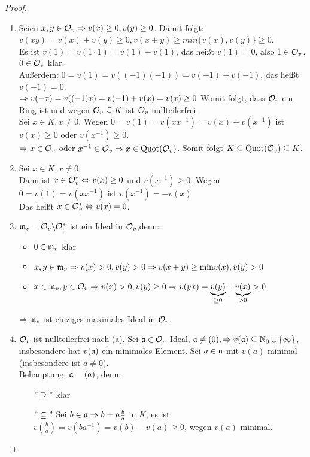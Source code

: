 \begin{proof}
	\begin{enumerate} [label= \alph*)]
		\item Seien $x,y \in \mathcal{O}_v \Rightarrow v(x) \geq 0, v(y) \geq 0$. Damit folgt: $v(xy) = v(x) +v(y) \geq 0, v(x+y) \geq min\{v(x),v(y)\} \geq 0$.\\
		 Es ist $v(1)=v(1 \cdot 1) = v(1) +v(1)$, das heißt $v(1)=0 $, also $1 \in \mathcal{O}_v$. $0 \in \mathcal{O}_v$ klar. \\
		Außerdem: $0 = v(1) =v((-1)(-1)) = v(-1) +v(-1)$, das heißt $v(-1) = 0 $. \\
		$\Rightarrow v(-x) = v((-1)x) = v(-1)+v(x) =v(x) \geq 0 $ Womit folgt, dass $\mathcal{O}_v$ ein Ring ist und  wegen $\mathcal{O}_v \subseteq K $ ist $\mathcal{O}_v $ nullteilerfrei. \\
		Sei $x \in K, x \neq 0 $. Wegen $0 = v(1)= v(xx^{-1}) = v(x) + v(x^{-1})$ ist $v(x) \geq 0 $ oder $v(x^{-1}) \geq 0 $.\\
		$\Rightarrow x \in \mathcal{O}_v $ oder $ x^{-1} \in \mathcal{O}_v \Rightarrow x \in \operatorname{Quot}(\mathcal{O}_v)$. Somit folgt $K \subseteq \operatorname{Quot}(\mathcal{O}_v) \subseteq K $. 
		\item Sei $x \in K, x \neq 0 $. \\ 
		Dann ist $ x \in \mathcal{O}_v^{*} \Leftrightarrow v(x) \geq 0$ und $ v(x^{-1}) \geq 0$.
		Wegen $0 = v(1) = v(xx^{-1})$ ist $v(x^{-1}) = - v(x) $ \\
		Das heißt $x \in \mathcal{O}_v^{*} \Leftrightarrow v(x) = 0 $.
		\item $\mathfrak{m}_v = \mathcal{O}_v \backslash \mathcal{O}_v^{*} $ ist ein Ideal in $\mathcal{O}_v $,denn: 
		\begin{itemize}
			\item $0 \in \mathfrak{m}_v $ klar 
			\item $x,y \in \mathfrak{m}_v \Rightarrow v(x) > 0, v(y) > 0 \Rightarrow v(x+y) \geq \text{min}{v(x),v(y)} > 0$
			\item $ x \in \mathfrak{m}_v, y\in \mathcal{O}_v \Rightarrow v(x) >0, v(y) \geq 0 \Rightarrow v(yx) = \underbrace{v(y)}_{\geq 0} + \underbrace{v(x)}_{ > 0} >0 $
		\end{itemize}
		$\Rightarrow \mathfrak{m}_v$  ist einziges maximales Ideal in $\mathcal{O}_v$.
		\item $\mathcal{O}_v$ ist nullteilerfrei nach (a). Sei $\mathfrak{a} \in \mathcal{O}_v $ Ideal, $\mathfrak{a} \neq (0), \Rightarrow v(\mathfrak{a}) \subseteq \mathbb{N}_0 \cup \{\infty\}$, insbesondere hat $v(\mathfrak{a}) $ ein minimales Element. Sei $a \in \mathfrak{a}$ mit $ v(a) $ minimal (insbesondere ist $a\neq 0 $). \\
		Behauptung: $ \mathfrak{a} = (a) $, denn: 
		\begin{enumerate}
			\item[$"\supseteq"$] klar 
			\item[$"\subseteq"$] Sei $b \in \mathfrak{a} \Rightarrow b = a \frac{b}{a} $ in $K$, es ist $v(\frac{b}{a}) = v(ba^{-1}) = v(b) -v(a) \geq 0$, wegen $v(a) $ minimal. \\

\end{enumerate}
\end{enumerate}
\end{proof}
